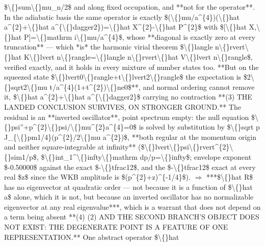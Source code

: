 \begin{description}
\$\textbackslash\{\}sum\textbackslash\{\}mu\_n/2\$ and along fixed occupation, and **not for the operator**. In the adiabatic basis the same operator is exactly \$(\textbackslash\{\}mu/a\textasciicircum{}\{4\})(\textbackslash\{\}hat a\textasciicircum{}\{2\}+\textbackslash\{\}hat a\textasciicircum{}\{\textbackslash\{\}dagger2\})=\textbackslash\{\}hat X\textasciicircum{}\{2\}-\textbackslash\{\}hat P\textasciicircum{}\{2\}\$ with \$[\textbackslash\{\}hat X,\textbackslash\{\}hat P]=\textbackslash\{\}mathrm i\textbackslash\{\}mu/a\textasciicircum{}\{4\}\$, whose **diagonal is exactly zero at every truncation** --- which *is* the harmonic virial theorem \$\textbackslash\{\}langle n\textbackslash\{\}rvert\textbackslash\{\}hat K\textbackslash\{\}lvert n\textbackslash\{\}rangle=\textbackslash\{\}langle n\textbackslash\{\}rvert\textbackslash\{\}hat V\textbackslash\{\}lvert n\textbackslash\{\}rangle\$, verified exactly, and it holds in every mixture of number states too. **But on the squeezed state \$\textbackslash\{\}lvert0\textbackslash\{\}rangle+t\textbackslash\{\}lvert2\textbackslash\{\}rangle\$ the expectation is \$2\textbackslash\{\}sqrt2\textbackslash\{\}mu t/a\textasciicircum{}\{4\}(1+t\textasciicircum{}\{2\})\textbackslash\{\}ne0\$**, and normal ordering cannot remove it, \$\textbackslash\{\}hat a\textasciicircum{}\{2\}+\textbackslash\{\}hat a\textasciicircum{}\{\textbackslash\{\}dagger2\}\$ carrying no contraction  **(3) THE LANDED CONCLUSION SURVIVES, ON STRONGER GROUND.** The residual is an **inverted oscillator**, point spectrum empty: the null equation \$\textbackslash\{\}psi''+p\textasciicircum{}\{2\}\textbackslash\{\}psi/\textbackslash\{\}mu\textasciicircum{}\{2\}a\textasciicircum{}\{4\}=0\$ is solved by substitution by \$\textbackslash\{\}sqrt p J\_\{\textbackslash\{\}pm1/4\}(p\textasciicircum{}\{2\}/2\textbackslash\{\}mu a\textasciicircum{}\{2\})\$, **both regular at the momentum origin and neither square-integrable at infinity** (\$\textbackslash\{\}lvert\textbackslash\{\}psi\textbackslash\{\}rvert\textasciicircum{}\{2\}\textbackslash\{\}sim1/p\$, \$\textbackslash\{\}int\_1\textasciicircum{}\textbackslash\{\}infty\textbackslash\{\}mathrm dp/p=\textbackslash\{\}infty\$; envelope exponent \$-0.50000\$ against the exact \$-\textbackslash\{\}tfrac12\$, and the \$-\textbackslash\{\}tfrac12\$ exact at every real \$z\$ since the WKB amplitude is \$(p\textasciicircum{}\{2\}+z)\textasciicircum{}\{-1/4\}\$). \ensuremath{\Rightarrow} ***\$\textbackslash\{\}hat R\$ has no eigenvector at quadratic order --- not because it is a function of \$\textbackslash\{\}hat a\$ alone, which it is not, but because an inverted oscillator has no normalizable eigenvector at any real eigenvalue***, which is a warrant that does not depend on a term being absent  **(4) (2) AND THE SECOND BRANCH'S OBJECT DOES NOT EXIST: THE DEGENERATE POINT IS A FEATURE OF ONE REPRESENTATION.** One abstract operator \$\textbackslash\{\}hat 
\end{description}

